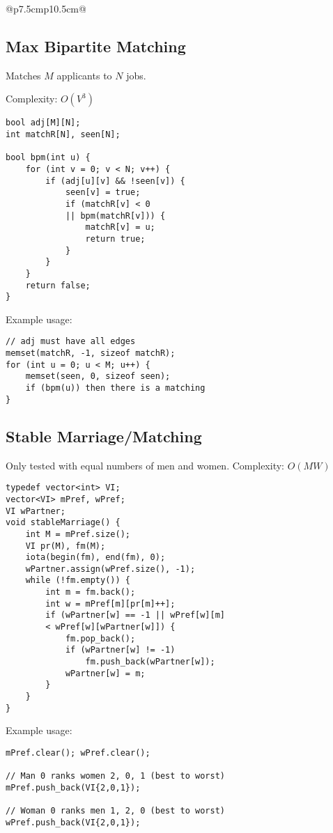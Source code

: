 \documentclass[letterpaper]{article}
\begin{document}
\clearpage
\vspace*{-3em}
\begin{tabular}{@{}p{7.5cm}p{10.5cm}@{}}
\subsection{Max Bipartite Matching}

Matches $M$ applicants to $N$ jobs.

Complexity: $O\left(V^3\right)$
\begin{lstlisting}
bool adj[M][N];
int matchR[N], seen[N];

bool bpm(int u) {
	for (int v = 0; v < N; v++) {
		if (adj[u][v] && !seen[v]) {
			seen[v] = true;
			if (matchR[v] < 0
			|| bpm(matchR[v])) {
				matchR[v] = u;
				return true;
			}
		}
	}
	return false;
}
\end{lstlisting}

Example usage:
\begin{lstlisting}
// adj must have all edges
memset(matchR, -1, sizeof matchR);
for (int u = 0; u < M; u++) {
	memset(seen, 0, sizeof seen);
	if (bpm(u)) then there is a matching
}
\end{lstlisting}

\subsection{Stable Marriage/Matching}

Only tested with equal numbers of men and women. Complexity: $O\left(MW\right)$

\begin{lstlisting}
typedef vector<int> VI;
vector<VI> mPref, wPref;
VI wPartner;
void stableMarriage() {
	int M = mPref.size();
	VI pr(M), fm(M);
	iota(begin(fm), end(fm), 0);
	wPartner.assign(wPref.size(), -1);
	while (!fm.empty()) {
		int m = fm.back();
		int w = mPref[m][pr[m]++];
		if (wPartner[w] == -1 || wPref[w][m]
		< wPref[w][wPartner[w]]) {
			fm.pop_back();
			if (wPartner[w] != -1)
				fm.push_back(wPartner[w]);
			wPartner[w] = m;
		}
	}
}
\end{lstlisting}

Example usage:
\begin{lstlisting}
mPref.clear(); wPref.clear();

// Man 0 ranks women 2, 0, 1 (best to worst)
mPref.push_back(VI{2,0,1});

// Woman 0 ranks men 1, 2, 0 (best to worst)
wPref.push_back(VI{2,0,1});


\end{lstlisting}
\end{tabular}
\end{document}
